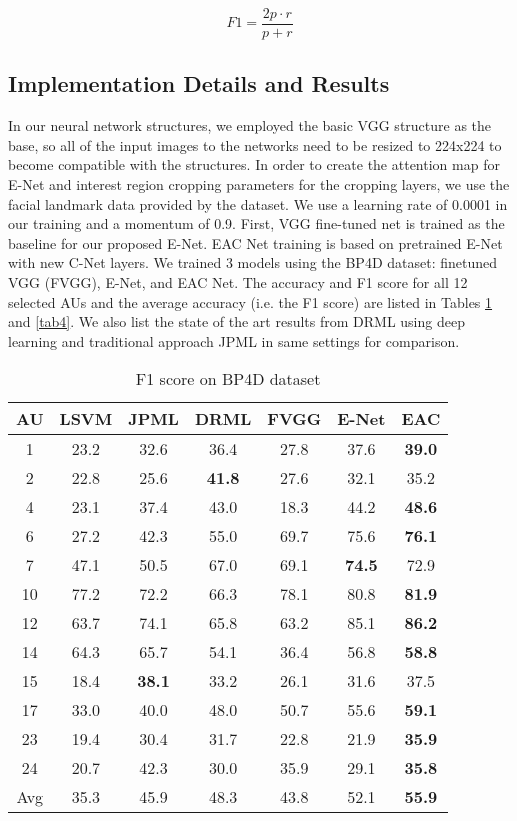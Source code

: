 \documentclass[a4paper, 10pt, conference]{ieeeconf}      %
\begin{document}
\begin{equation}
\label{f1eq}
F1=\frac{2p\cdot r}{p+r}
\end{equation}

\subsection{Implementation Details and Results}
In our neural network structures, we employed the basic VGG structure as the base, so all of the input images to the networks need to be resized to 224x224 to become compatible with the structures. In order to create the attention map for E-Net and interest region cropping parameters for the cropping layers, we use the facial landmark data provided by the dataset. We use a learning rate of 0.0001 in our training and a momentum of 0.9. First, VGG fine-tuned net is trained as the baseline for our proposed E-Net. EAC Net training is based on pretrained E-Net with new C-Net layers.
We trained 3 models using the BP4D dataset: finetuned VGG (FVGG), E-Net, and EAC Net. The accuracy and F1 score for all 12 selected AUs and the average accuracy (i.e. the F1 score) are listed in Tables \ref{tab3} and \ref{tab4}. We also list the state of the art results from DRML \cite{p22} using deep learning and traditional approach JPML \cite{p13} in same settings for comparison.


\begin{table}
\caption{F1 score on BP4D dataset}
\label{tab3}
\begin{center}
\begin{tabular}{|c|c|c|c|c|c|c|}
\hline
AU& LSVM& JPML\cite{p13}& DRML\cite{p22}& FVGG& E-Net& EAC\\
\hline
1& 23.2& 32.6& 36.4& 27.8 &37.6& {\bf 39.0}\\
2& 22.8& 25.6& {\bf 41.8}& 27.6& 32.1& 35.2\\
4& 23.1& 37.4& 43.0& 18.3& 44.2& {\bf 48.6}\\
6& 27.2& 42.3& 55.0& 69.7& 75.6& {\bf 76.1}\\
7& 47.1& 50.5& 67.0& 69.1& {\bf 74.5}& 72.9\\
10&77.2&72.2&66.3&78.1&80.8&{\bf 81.9}\\
12&63.7&74.1&65.8&63.2&85.1&{\bf 86.2}\\
14&64.3&65.7&54.1&36.4&56.8&{\bf 58.8}\\
15&18.4&{\bf 38.1}&33.2&26.1&31.6&37.5\\
17&33.0&40.0&48.0&50.7&55.6&{\bf 59.1}\\
23&19.4&30.4&31.7&22.8&21.9&{\bf 35.9}\\
24&20.7&42.3&30.0&35.9&29.1&{\bf 35.8}\\
Avg&35.3&45.9&48.3&43.8&52.1&{\bf55.9}\\
\hline
\end{tabular}
\end{center}
\end{table}
\end{document}
